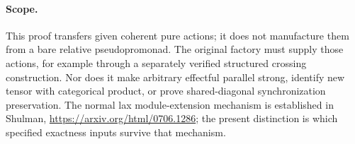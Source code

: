 \documentclass{article}
\begin{document}
\paragraph{Scope.} This proof transfers given coherent pure actions; it does not manufacture them from a bare relative pseudopromonad. The original factory must supply those actions, for example through a separately verified structured crossing construction. Nor does it make arbitrary effectful parallel strong, identify new tensor with categorical product, or prove shared-diagonal synchronization preservation. The normal lax module-extension mechanism is established in Shulman, \url{https://arxiv.org/html/0706.1286}; the present distinction is which specified exactness inputs survive that mechanism.
\end{document}
